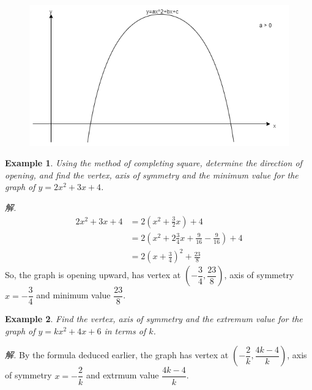 \documentclass[12pt]{article}
\newtheorem{example}{Example}
\begin{document}
    \begin{figure}[H]
        \centering
        \includegraphics[scale=0.6]{open_downward.png}
    \end{figure}

    \begin{example}
        Using the method of completing square, determine the direction of opening, and find the vertex, axis of symmetry and the minimum value for the graph of $y=2x^2+3x+4$.
    \end{example}

    \textit{ 解.}\begin{align*}
        2x^2+3x+4&=2(x^2+\frac{3}{2}x)+4\\
        &=2(x^2+2\frac{3}{4}x+\frac{9}{16}-\frac{9}{16})+4\\
        &=2(x+\frac{3}{4})^2+\frac{23}{8}
    \end{align*}
    So, the graph is opening upward, has vertex at $(-\dfrac{3}{4},\dfrac{23}{8})$, axis of symmetry $x=-\dfrac{3}{4}$ and minimum value $\dfrac{23}{8}$.

    \begin{example}
        Find the vertex, axis of symmetry and the extremum value for the graph of $y=kx^2+4x+6$ in terms of $k$.
    \end{example}

    \textit{ 解.}
    By the formula deduced earlier, the graph has vertex at $(-\dfrac{2}{k},\dfrac{4k-4}{k})$, axis of symmetry $x=-\dfrac{2}{k}$ and extrmum value $\dfrac{4k-4}{k}$.
\end{document}
